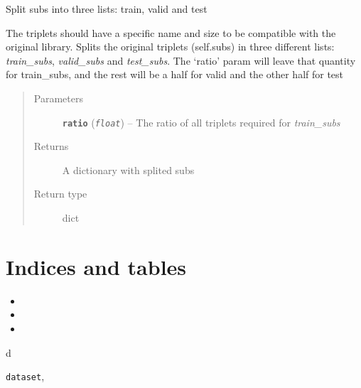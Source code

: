\documentclass[letterpaper,10pt,english]{sphinxmanual}
\begin{document}
\begin{fulllineitems}
\begin{fulllineitems}
\begin{quote}
\begin{description}
\end{description}\end{quote}

\end{fulllineitems}


\begin{fulllineitems}
\label{index:dataset.Dataset.train_split}
Split subs into three lists: train, valid and test

The triplets should have a specific name and size to be compatible
with the original library. Splits the original triplets (self.subs) in
three different lists: \emph{train\_subs}, \emph{valid\_subs} and \emph{test\_subs}.
The `ratio' param will leave that quantity for train\_subs, and the
rest will be a half for valid and the other half for test
\begin{quote}\begin{description}
\item[{Parameters}] \leavevmode
\textbf{\texttt{ratio}} (\emph{\texttt{float}}) -- The ratio of all triplets required for \emph{train\_subs}

\item[{Returns}] \leavevmode
A dictionary with splited subs

\item[{Return type}] \leavevmode
dict

\end{description}\end{quote}

\end{fulllineitems}


\end{fulllineitems}



\chapter{Indices and tables}
\label{index:indices-and-tables}\label{index:welcome-to-practicum-s-documentation}\begin{itemize}
\item {} 

\item {} 

\item {} 

\end{itemize}


\renewcommand{\indexname}{Python Module Index}
\begin{theindex}
\def\bigletter#1{{\Large\sffamily#1}\nopagebreak\vspace{1mm}}
\bigletter{d}
\item {\texttt{dataset}}, \pageref{index:module-dataset}
\end{theindex}

\renewcommand{\indexname}{Index}
\printindex
\end{document}
